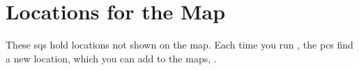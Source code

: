 \section{Locations for the Map}

These \glspl{sq} hold locations not shown on the map.
Each time you run , the \glspl{pc} find a new location, which you can add to the maps, .
